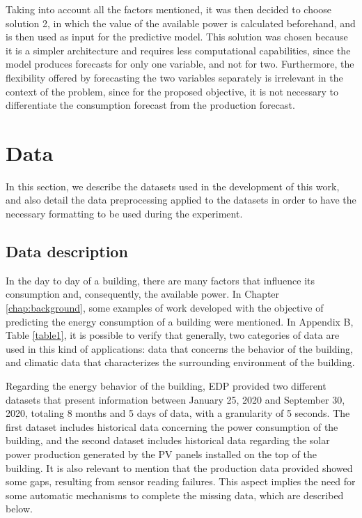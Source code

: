 Taking into account all the factors mentioned, it was then decided to choose solution 2, in which the value of the available power is calculated beforehand, and is then used as input for the predictive model. This solution was chosen because it is a simpler architecture and requires less computational capabilities, since the model produces forecasts for only one variable, and not for two. Furthermore, the flexibility offered by forecasting the two variables separately is irrelevant in the context of the problem, since for the proposed objective, it is not necessary to differentiate the consumption forecast from the production forecast. 

\section{Data}\label{chap3:sec:data}

In this section, we describe the datasets used in the development of this work, and also detail the data preprocessing applied to the datasets in order to have the necessary formatting to be used during the experiment.

\subsection{Data description}\label{chap3:subsec:data_description}

In the day to day of a building, there are many factors that influence its consumption and, consequently, the available power. In Chapter \ref{chap:background}, some examples of work developed with the objective of predicting the energy consumption of a building were mentioned. In Appendix B, Table \ref{table1}, it is possible to verify that generally, two categories of data are used in this kind of applications: data that concerns the behavior of the building, and climatic data that characterizes the surrounding environment of the building.

Regarding the energy behavior of the building, \ac{EDP} provided two different datasets that present information between January 25, 2020 and September 30, 2020, totaling 8 months and 5 days of data, with a granularity of 5 seconds. The first dataset includes historical data concerning the power consumption of the building, and the second dataset includes historical data regarding the solar power production generated by the \ac{PV} panels installed on the top of the building. It is also relevant to mention that the production data provided showed some gaps, resulting from sensor reading failures. This aspect implies the need for some automatic mechanisms to complete the missing data, which are described below.

